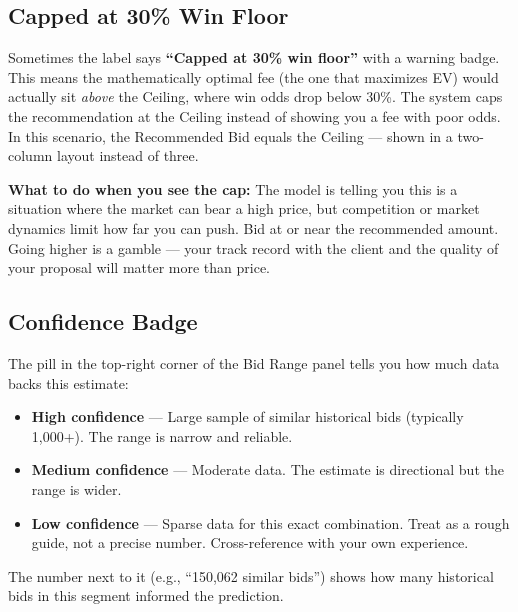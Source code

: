 \documentclass[12pt,a4paper]{article}
\begin{document}
\subsection{Capped at 30\% Win Floor}

Sometimes the label says \textbf{``Capped at 30\% win floor''} with a warning badge.
This means the mathematically optimal fee (the one that maximizes EV) would actually
sit \emph{above} the Ceiling, where win odds drop below 30\%. The system caps the
recommendation at the Ceiling instead of showing you a fee with poor odds. In this
scenario, the Recommended Bid equals the Ceiling --- shown in a two-column layout
instead of three.

\textbf{What to do when you see the cap:} The model is telling you this is a situation
where the market can bear a high price, but competition or market dynamics limit how
far you can push. Bid at or near the recommended amount. Going higher is a gamble ---
your track record with the client and the quality of your proposal will matter more
than price.

\subsection{Confidence Badge}

The pill in the top-right corner of the Bid Range panel tells you how much data backs
this estimate:

\begin{itemize}[leftmargin=2em]
    \item \textbf{High confidence} --- Large sample of similar historical bids
          (typically 1,000+). The range is narrow and reliable.
    \item \textbf{Medium confidence} --- Moderate data. The estimate is directional
          but the range is wider.
    \item \textbf{Low confidence} --- Sparse data for this exact combination. Treat
          as a rough guide, not a precise number. Cross-reference with your own
          experience.
\end{itemize}

The number next to it (e.g., ``150,062 similar bids'') shows how many historical bids
in this segment informed the prediction.
\end{document}
